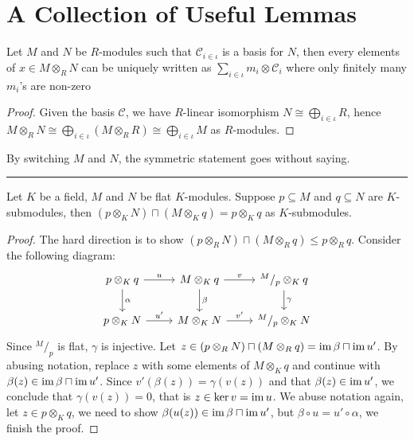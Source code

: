 \setcounter{chapter}{-1}
\chapter{A Collection of Useful Lemmas}

\begin{lemma}\label{lem:expand-tensor-in-basis}
  Let $M$ and $N$ be $R$-modules such that $\mathcal{C}_{i\in\iota}$ is a basis for $N$, then every elements of $x \in M \otimes_{R} N$ can be uniquely written as $\sum_{i\in\iota}m_{i}\otimes \mathcal{C}_{i}$ where only finitely many $m_{i}$'s are non-zero
\end{lemma}

\begin{proof}
  Given the basis $\mathcal{C}$, we have $R$-linear isomorphism $N \cong\bigoplus_{i\in\iota}R$, hence $M\otimes_{R}N \cong \bigoplus_{i\in\iota}(M\otimes_{R}R)\cong\bigoplus_{i\in\iota}M$ as $R$-modules.
\end{proof}
By switching $M$ and $N$, the symmetric statement goes without saying.

\noindent\rule{\textwidth}{0.2pt}

\begin{lemma}

  Let $K$ be a field, $M$ and $N$ be flat $K$-modules. Suppose $p \subseteq M$ and $q \subseteq N$ are $K$-submodules, then $(p \otimes_{K} N) \sqcap (M \otimes_{K} q) = p \otimes_{K} q$ as $K$-submodules.
\end{lemma}

\begin{proof}
  The hard direction is to show $(p \otimes_{R} N) \sqcap (M \otimes_{R} q) \le p \otimes_{R} q$. Consider the following diagram:
  \[
    \begin{tikzcd}
      p \otimes_{K} q \ar[r, "u"] \ar[d, "\alpha"] & M \otimes_{K} q \ar[r, "v"] \ar[d, "\beta"] & {}^{M}/_{p} \otimes_{K} q \ar[d, "\gamma"] \\
      p \otimes_{K} N \ar[r, "u'"] & M \otimes_{K} N \ar[r, "v'"] & ^{M}/_{p} \otimes_{K} N
    \end{tikzcd}
  \]
  Since $^{M}/_{p}$ is flat, $\gamma$ is injective.
  Let $z \in (p \otimes_{R} N) \sqcap (M \otimes_{R} q) = \operatorname{im} \beta \sqcap \operatorname{im} u'$. By abusing notation, replace $z$ with some elements of $M \otimes_{K} q$ and continue with $\beta(z)\in\operatorname{im} \beta \sqcap \operatorname{im} u'$. Since $v'(\beta(z))=\gamma(v(z))$ and that $\beta(z)\in \operatorname{im} u'$, we conclude that $\gamma(v(z))=0$, that is $z\in\ker v=\operatorname{im} u$. We abuse notation again, let $z \in p \otimes_{K} q$, we need to show $\beta(u(z))\in\operatorname{im} \beta \sqcap \operatorname{im} u'$, but $\beta\circ u=u'\circ\alpha$, we finish the proof.
\end{proof}

